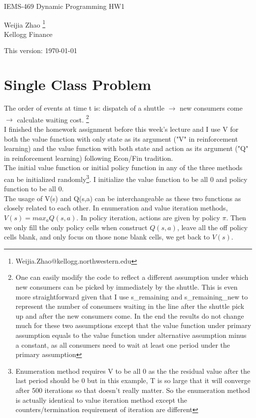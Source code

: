 \documentclass[12pt,letterpaper]{article}
\begin{document}
\begin{center}
\large IEMS-469 Dynamic Programming  HW1

\bigskip
Weijia Zhao \footnote{Weijia.Zhao@kellogg.northwestern.edu}\\
Kellogg Finance

\bigskip
This version: \today
\end{center}

\newpage

\section{Single Class Problem}
The order of events at time t is: dispatch of a shuttle $\rightarrow$ new consumers come $\rightarrow$ calculate waiting cost.  \footnote{One can easily modify the code to reflect a different assumption under which new consumers can be picked by immediately by the shuttle. This is even more straightforward given that I use s\_remaining and s\_remaining\_new to represent the number of consumers waiting in the line after the shuttle pick up and after the new consumers come. In the end the results do not change much for these two assumptions except that the value function under primary assumption equals to the value function under alternative assumption minus a constant, as all consumers need to wait at least one period under the primary assumption}\\

I finished the homework assignment before this week's lecture and I use V for both the value function with only state as its argument ("V" in reinforcement learning) and the value function with both state and action as its argument ("Q" in reinforcement learning) following Econ/Fin tradition. \\

The initial value function or initial policy function in any of the three methods can be initialized randomly\footnote{Enumeration method requires V to be all 0 as the the residual value after the last period should be 0 but in this example, T is so large that it will converge after 500 iterations so that doesn't really matter. So the enumeration method is actually identical to value iteration method except the counters/termination requirement of iteration are different}. I initialize the value function to be all 0 and policy function to be all 0. \\

The usage of V(s) and Q(s,a) can be interchangeable as these two functions as closely related to each other. In enumeration and value iteration methods, $V(s)=max_{a} Q(s,a)$. In policy iteration, actions are given by policy $\pi$. Then we only fill the only policy cells when construct $Q(s,a)$, leave all the off policy cells blank, and only focus on those none blank cells, we get back to $V(s)$.\\
\end{document}
